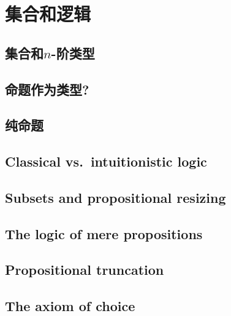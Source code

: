 \chapter{集合和逻辑}
\label{cha:logic}


\section{集合和\texorpdfstring{$n$}{n}-阶类型}
\label{sec:basics-sets}


\section{命题作为类型?}
\label{subsec:pat?}


\section{纯命题}
\label{subsec:hprops}


\section{Classical vs.\ intuitionistic logic}
\label{sec:intuitionism}


\section{Subsets and propositional resizing}
\label{subsec:prop-subsets}


\section{The logic of mere propositions}
\label{subsec:logic-hprop}


\section{Propositional truncation}
\label{subsec:prop-trunc}


\section{The axiom of choice}
\label{sec:axiom-choice}


